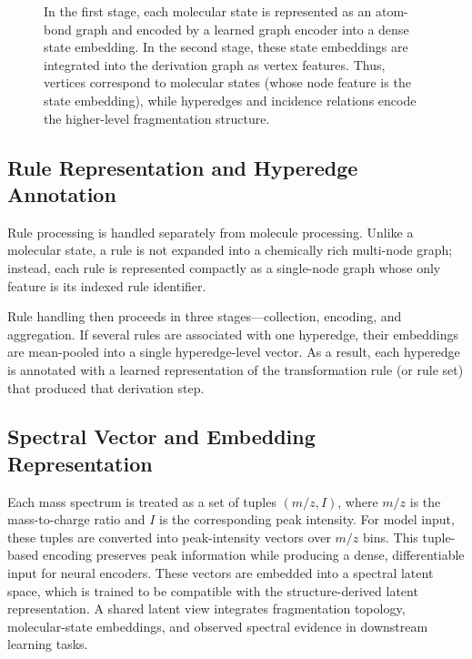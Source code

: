 \begin{figure}[H]
    \centering
    \resizebox{0.9\textwidth}{!}{
        
    }
    \caption[Two-Level Molecular Latent Representation]{
        In the first stage, each molecular state  is represented as an atom-bond graph and encoded by a learned graph encoder into a dense state embedding.
        In the second stage, these state embeddings are integrated into the derivation graph as vertex features.
        Thus, vertices correspond to molecular states (whose node feature is the state embedding), while hyperedges and incidence relations encode the higher-level fragmentation structure.
    }
    \label{fig:two_level_molecular_latent_representation}
\end{figure}

\subsection{Rule Representation and Hyperedge Annotation}
\label{sec:rule-representation}

Rule processing is handled separately from molecule processing.
Unlike a molecular state, a rule is not expanded into a chemically rich multi-node graph; instead, each rule is represented compactly as a single-node graph whose only feature is its indexed rule identifier.

Rule handling then proceeds in three stages---collection, encoding, and aggregation.
If several rules are associated with one hyperedge, their embeddings are mean-pooled into a single hyperedge-level vector.
As a result, each hyperedge is annotated with a learned representation of the transformation rule (or rule set) that produced that derivation step.

\subsection{Spectral Vector and Embedding Representation}
\label{sec:spectrumEnc}
Each mass spectrum is treated as a set of tuples $(m/z, I)$, where $m/z$ is the mass-to-charge ratio and $I$ is the corresponding peak intensity.
For model input, these tuples are converted into peak-intensity vectors over $m/z$ bins. 
This tuple-based encoding preserves peak information while producing a dense, differentiable input for neural encoders.
These vectors are embedded into a spectral latent space, which is trained to be compatible with the structure-derived latent representation.
A shared latent view integrates fragmentation topology, molecular-state embeddings, and observed spectral evidence in downstream learning tasks.

